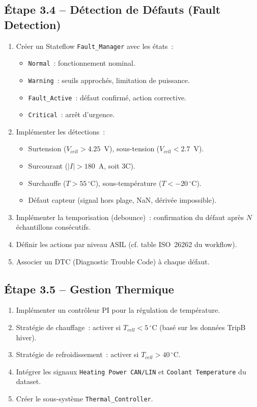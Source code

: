 \documentclass[a4paper,12pt]{article}
\begin{document}
\subsection{Étape 3.4 -- Détection de Défauts (Fault Detection)}
\begin{enumerate}[nosep]
  \item Créer un Stateflow \texttt{Fault\_Manager} avec les états~:
    \begin{itemize}[nosep]
      \item \texttt{Normal}~: fonctionnement nominal.
      \item \texttt{Warning}~: seuils approchés, limitation de puissance.
      \item \texttt{Fault\_Active}~: défaut confirmé, action corrective.
      \item \texttt{Critical}~: arrêt d'urgence.
    \end{itemize}
  \item Implémenter les détections~:
    \begin{itemize}[nosep]
      \item Surtension ($V_{cell} > 4.25$~V), sous-tension ($V_{cell} < 2.7$~V).
      \item Surcourant ($|I| > 180$~A, soit 3C).
      \item Surchauffe ($T > 55\,^{\circ}$C), sous-température ($T < -20\,^{\circ}$C).
      \item Défaut capteur (signal hors plage, NaN, dérivée impossible).
    \end{itemize}
  \item Implémenter la temporisation (debounce)~: confirmation du défaut après $N$ échantillons consécutifs.
  \item Définir les actions par niveau ASIL (cf. table ISO~26262 du workflow).
  \item Associer un DTC (Diagnostic Trouble Code) à chaque défaut.
\end{enumerate}

\subsection{Étape 3.5 -- Gestion Thermique}
\begin{enumerate}[nosep]
  \item Implémenter un contrôleur PI pour la régulation de température.
  \item Stratégie de chauffage~: activer si $T_{cell} < 5\,^{\circ}$C (basé sur les données TripB hiver).
  \item Stratégie de refroidissement~: activer si $T_{cell} > 40\,^{\circ}$C.
  \item Intégrer les signaux \texttt{Heating Power CAN/LIN} et \texttt{Coolant Temperature} du dataset.
  \item Créer le sous-système \texttt{Thermal\_Controller}.
\end{enumerate}
\end{document}
